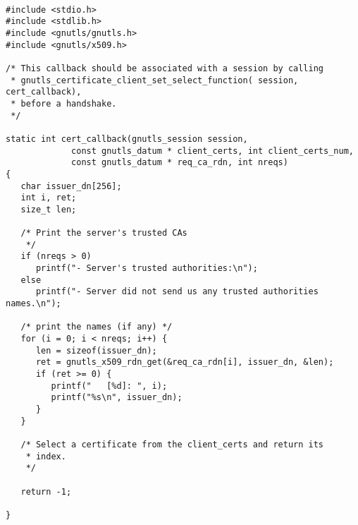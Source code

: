 \begin{verbatim}

#include <stdio.h>
#include <stdlib.h>
#include <gnutls/gnutls.h>
#include <gnutls/x509.h>

/* This callback should be associated with a session by calling
 * gnutls_certificate_client_set_select_function( session, cert_callback),
 * before a handshake.
 */

static int cert_callback(gnutls_session session,
			 const gnutls_datum * client_certs, int client_certs_num,
			 const gnutls_datum * req_ca_rdn, int nreqs)
{
   char issuer_dn[256];
   int i, ret;
   size_t len;

   /* Print the server's trusted CAs
    */
   if (nreqs > 0)
      printf("- Server's trusted authorities:\n");
   else
      printf("- Server did not send us any trusted authorities names.\n");

   /* print the names (if any) */
   for (i = 0; i < nreqs; i++) {
      len = sizeof(issuer_dn);
      ret = gnutls_x509_rdn_get(&req_ca_rdn[i], issuer_dn, &len);
      if (ret >= 0) {
         printf("   [%d]: ", i);
         printf("%s\n", issuer_dn);
      }
   }

   /* Select a certificate from the client_certs and return its
    * index.
    */

   return -1;

}

\end{verbatim}
